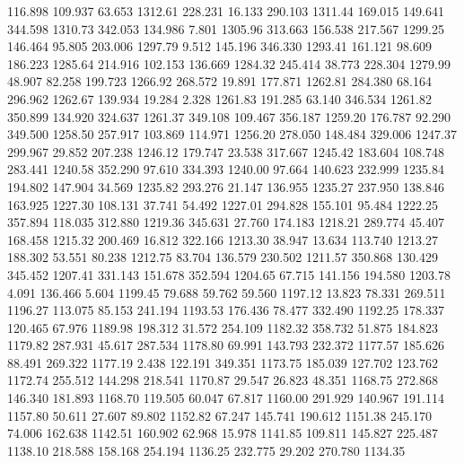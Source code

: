  116.898  109.937   63.653      1312.61
 228.231   16.133  290.103      1311.44
 169.015  149.641  344.598      1310.73
 342.053  134.986    7.801      1305.96
 313.663  156.538  217.567      1299.25
 146.464   95.805  203.006      1297.79
   9.512  145.196  346.330      1293.41
 161.121   98.609  186.223      1285.64
 214.916  102.153  136.669      1284.32
 245.414   38.773  228.304      1279.99
  48.907   82.258  199.723      1266.92
 268.572   19.891  177.871      1262.81
 284.380   68.164  296.962      1262.67
 139.934   19.284    2.328      1261.83
 191.285   63.140  346.534      1261.82
 350.899  134.920  324.637      1261.37
 349.108  109.467  356.187      1259.20
 176.787   92.290  349.500      1258.50
 257.917  103.869  114.971      1256.20
 278.050  148.484  329.006      1247.37
 299.967   29.852  207.238      1246.12
 179.747   23.538  317.667      1245.42
 183.604  108.748  283.441      1240.58
 352.290   97.610  334.393      1240.00
  97.664  140.623  232.999      1235.84
 194.802  147.904   34.569      1235.82
 293.276   21.147  136.955      1235.27
 237.950  138.846  163.925      1227.30
 108.131   37.741   54.492      1227.01
 294.828  155.101   95.484      1222.25
 357.894  118.035  312.880      1219.36
 345.631   27.760  174.183      1218.21
 289.774   45.407  168.458      1215.32
 200.469   16.812  322.166      1213.30
  38.947   13.634  113.740      1213.27
 188.302   53.551   80.238      1212.75
  83.704  136.579  230.502      1211.57
 350.868  130.429  345.452      1207.41
 331.143  151.678  352.594      1204.65
  67.715  141.156  194.580      1203.78
   4.091  136.466    5.604      1199.45
  79.688   59.762   59.560      1197.12
  13.823   78.331  269.511      1196.27
 113.075   85.153  241.194      1193.53
 176.436   78.477  332.490      1192.25
 178.337  120.465   67.976      1189.98
 198.312   31.572  254.109      1182.32
 358.732   51.875  184.823      1179.82
 287.931   45.617  287.534      1178.80
  69.991  143.793  232.372      1177.57
 185.626   88.491  269.322      1177.19
   2.438  122.191  349.351      1173.75
 185.039  127.702  123.762      1172.74
 255.512  144.298  218.541      1170.87
  29.547   26.823   48.351      1168.75
 272.868  146.340  181.893      1168.70
 119.505   60.047   67.817      1160.00
 291.929  140.967  191.114      1157.80
  50.611   27.607   89.802      1152.82
  67.247  145.741  190.612      1151.38
 245.170   74.006  162.638      1142.51
 160.902   62.968   15.978      1141.85
 109.811  145.827  225.487      1138.10
 218.588  158.168  254.194      1136.25
 232.775   29.202  270.780      1134.35
